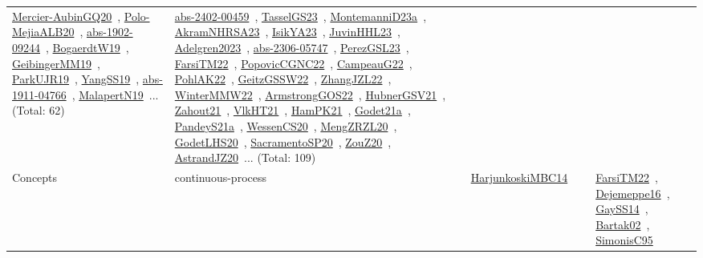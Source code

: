 {\begin{longtable}{lp{3cm}>{\raggedright\arraybackslash}p{6cm}>{\raggedright\arraybackslash}p{6cm}>{\raggedright\arraybackslash}p{8cm}}
\href{../works/Mercier-AubinGQ20.pdf}{Mercier-AubinGQ20}~\cite{Mercier-AubinGQ20}, \href{../works/Polo-MejiaALB20.pdf}{Polo-MejiaALB20}~\cite{Polo-MejiaALB20}, \href{../works/abs-1902-09244.pdf}{abs-1902-09244}~\cite{abs-1902-09244}, \href{../works/BogaerdtW19.pdf}{BogaerdtW19}~\cite{BogaerdtW19}, \href{../works/GeibingerMM19.pdf}{GeibingerMM19}~\cite{GeibingerMM19}, \href{../works/ParkUJR19.pdf}{ParkUJR19}~\cite{ParkUJR19}, \href{../works/YangSS19.pdf}{YangSS19}~\cite{YangSS19}, \href{../works/abs-1911-04766.pdf}{abs-1911-04766}~\cite{abs-1911-04766}, \href{../works/MalapertN19.pdf}{MalapertN19}~\cite{MalapertN19}... (Total: 62) & \href{../works/abs-2402-00459.pdf}{abs-2402-00459}~\cite{abs-2402-00459}, \href{../works/TasselGS23.pdf}{TasselGS23}~\cite{TasselGS23}, \href{../works/MontemanniD23a.pdf}{MontemanniD23a}~\cite{MontemanniD23a}, \href{../works/AkramNHRSA23.pdf}{AkramNHRSA23}~\cite{AkramNHRSA23}, \href{../works/IsikYA23.pdf}{IsikYA23}~\cite{IsikYA23}, \href{../works/JuvinHHL23.pdf}{JuvinHHL23}~\cite{JuvinHHL23}, \href{../works/Adelgren2023.pdf}{Adelgren2023}~\cite{Adelgren2023}, \href{../works/abs-2306-05747.pdf}{abs-2306-05747}~\cite{abs-2306-05747}, \href{../works/PerezGSL23.pdf}{PerezGSL23}~\cite{PerezGSL23}, \href{../works/FarsiTM22.pdf}{FarsiTM22}~\cite{FarsiTM22}, \href{../works/PopovicCGNC22.pdf}{PopovicCGNC22}~\cite{PopovicCGNC22}, \href{../works/CampeauG22.pdf}{CampeauG22}~\cite{CampeauG22}, \href{../works/PohlAK22.pdf}{PohlAK22}~\cite{PohlAK22}, \href{../works/GeitzGSSW22.pdf}{GeitzGSSW22}~\cite{GeitzGSSW22}, \href{../works/ZhangJZL22.pdf}{ZhangJZL22}~\cite{ZhangJZL22}, \href{../works/WinterMMW22.pdf}{WinterMMW22}~\cite{WinterMMW22}, \href{../works/ArmstrongGOS22.pdf}{ArmstrongGOS22}~\cite{ArmstrongGOS22}, \href{../works/HubnerGSV21.pdf}{HubnerGSV21}~\cite{HubnerGSV21}, \href{../works/Zahout21.pdf}{Zahout21}~\cite{Zahout21}, \href{../works/VlkHT21.pdf}{VlkHT21}~\cite{VlkHT21}, \href{../works/HamPK21.pdf}{HamPK21}~\cite{HamPK21}, \href{../works/Godet21a.pdf}{Godet21a}~\cite{Godet21a}, \href{../works/PandeyS21a.pdf}{PandeyS21a}~\cite{PandeyS21a}, \href{../works/WessenCS20.pdf}{WessenCS20}~\cite{WessenCS20}, \href{../works/MengZRZL20.pdf}{MengZRZL20}~\cite{MengZRZL20}, \href{../works/GodetLHS20.pdf}{GodetLHS20}~\cite{GodetLHS20}, \href{../works/SacramentoSP20.pdf}{SacramentoSP20}~\cite{SacramentoSP20}, \href{../works/ZouZ20.pdf}{ZouZ20}~\cite{ZouZ20}, \href{../works/AstrandJZ20.pdf}{AstrandJZ20}~\cite{AstrandJZ20}... (Total: 109)\\
Concepts & continuous-process & \href{../works/HarjunkoskiMBC14.pdf}{HarjunkoskiMBC14}~\cite{HarjunkoskiMBC14} &  & \href{../works/FarsiTM22.pdf}{FarsiTM22}~\cite{FarsiTM22}, \href{../works/Dejemeppe16.pdf}{Dejemeppe16}~\cite{Dejemeppe16}, \href{../works/GaySS14.pdf}{GaySS14}~\cite{GaySS14}, \href{../works/Bartak02.pdf}{Bartak02}~\cite{Bartak02}, \href{../works/SimonisC95.pdf}{SimonisC95}~\cite{SimonisC95}\\

\end{longtable}}
